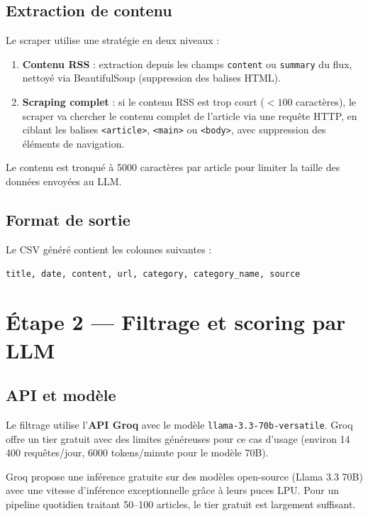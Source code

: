 \documentclass[11pt, a4paper]{article}
\begin{document}
\subsection{Extraction de contenu}

Le scraper utilise une stratégie en deux niveaux :
\begin{enumerate}
    \item \textbf{Contenu RSS} : extraction depuis les champs \texttt{content} ou \texttt{summary} du flux, nettoyé via BeautifulSoup (suppression des balises HTML).
    \item \textbf{Scraping complet} : si le contenu RSS est trop court ($< 100$ caractères), le scraper va chercher le contenu complet de l'article via une requête HTTP, en ciblant les balises \texttt{<article>}, \texttt{<main>} ou \texttt{<body>}, avec suppression des éléments de navigation.
\end{enumerate}

Le contenu est tronqué à 5000 caractères par article pour limiter la taille des données envoyées au LLM.

\subsection{Format de sortie}

Le CSV généré contient les colonnes suivantes :

\begin{center}
\texttt{title, date, content, url, category, category\_name, source}
\end{center}

\section{Étape 2 --- Filtrage et scoring par LLM}

\subsection{API et modèle}

Le filtrage utilise l'\textbf{API Groq} avec le modèle \texttt{llama-3.3-70b-versatile}. Groq offre un tier gratuit avec des limites généreuses pour ce cas d'usage (environ 14 400 requêtes/jour, 6000 tokens/minute pour le modèle 70B).

\begin{infobox}
Groq propose une inférence gratuite sur des modèles open-source (Llama 3.3 70B) avec une vitesse d'inférence exceptionnelle grâce à leurs puces LPU. Pour un pipeline quotidien traitant 50--100 articles, le tier gratuit est largement suffisant.
\end{infobox}
\end{document}
